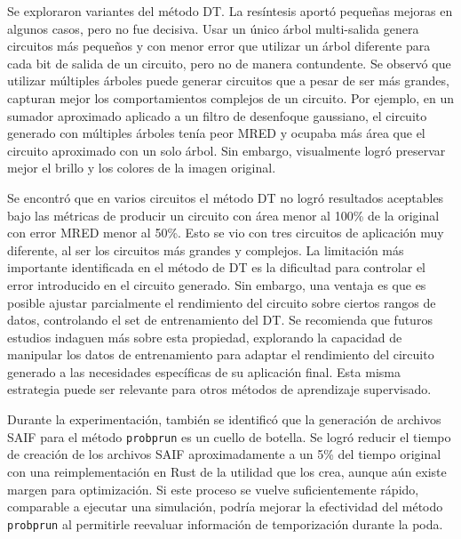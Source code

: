 Se exploraron variantes del método DT. La resíntesis aportó pequeñas mejoras en
algunos casos, pero no fue decisiva.
Usar un único árbol multi-salida genera circuitos más pequeños y con menor
error que utilizar un árbol diferente para cada bit de salida de un circuito,
pero no de manera contundente. Se observó que utilizar múltiples árboles puede
generar circuitos que a pesar de ser más grandes, capturan mejor los
comportamientos complejos de un circuito.
Por ejemplo, en un sumador aproximado aplicado a un filtro de desenfoque
gaussiano, el circuito generado con múltiples árboles tenía peor MRED y
ocupaba más área que el circuito aproximado con un solo árbol. Sin embargo,
visualmente logró preservar mejor el brillo y los colores de la imagen
original.

Se encontró que en varios circuitos el método DT no logró resultados aceptables
bajo las métricas de producir un circuito con área menor al 100\% de la
original con error MRED menor al 50\%. Esto se vio con tres circuitos de
aplicación muy diferente, al ser los circuitos más grandes y complejos.
La limitación más importante identificada en el método de DT es la dificultad
para controlar el error introducido en el circuito generado.
Sin embargo, una ventaja es que es posible ajustar parcialmente el rendimiento
del circuito sobre ciertos rangos de datos, controlando el set de entrenamiento
del DT.
Se recomienda que futuros estudios indaguen más sobre esta propiedad,
explorando la capacidad de manipular los datos de entrenamiento para adaptar el
rendimiento del circuito generado a las necesidades específicas de su
aplicación final.
Esta misma estrategia puede ser relevante para otros métodos de aprendizaje
supervisado.

Durante la experimentación, también se identificó que la generación de archivos
SAIF para el método \texttt{probprun} es un cuello de botella.
Se logró reducir el tiempo de creación de los archivos SAIF aproximadamente a
un 5\% del tiempo original con una reimplementación en Rust de la utilidad que
los crea, aunque aún existe margen para optimización.
Si este proceso se vuelve suficientemente rápido, comparable a ejecutar una
simulación, podría mejorar la efectividad del método \texttt{probprun} al
permitirle reevaluar información de temporización durante la poda.

